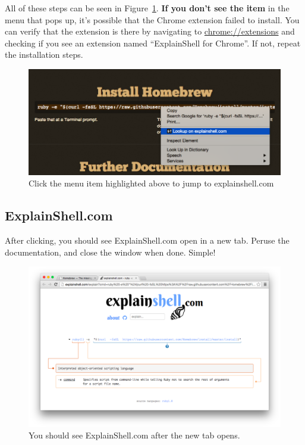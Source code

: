 \documentclass[11pt]{article}
\begin{document}
All of these steps can be seen in Figure~\ref{lookup}. \textbf{If you don't see the item} in the menu that pops up, it's possible that the Chrome extension failed to install. You can verify that the extension is there by navigating to \url{chrome://extensions} and checking if you see an extension named ``ExplainShell for Chrome''. If not, repeat the installation steps.

\vspace{0.2in}
\begin{figure}[H]
  \begin{center}
    \includegraphics[width=\textwidth, height=\textheight, keepaspectratio]{06lookup}
  \end{center}
  \caption{Click the menu item highlighted above to jump to explainshell.com}
  \label{lookup}
\end{figure}
\vspace{0.2in}

\subsection{ExplainShell.com}

After clicking, you should see ExplainShell.com open in a new tab. Peruse the documentation, and close the window when done. Simple!

\vspace{0.2in}
\begin{figure}[H]
  \begin{center}
    \includegraphics[width=\textwidth, height=\textheight, keepaspectratio]{07explainshell-website}
  \end{center}
  \caption{You should see ExplainShell.com after the new tab opens.}
  \label{explainshell-website}
\end{figure}
\vspace{0.2in}
\end{document}
